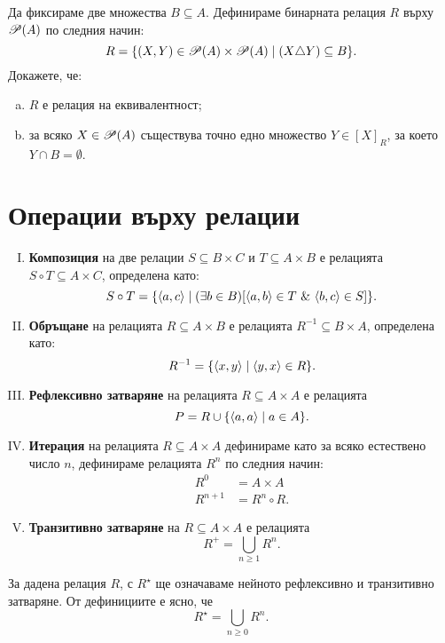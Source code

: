 \begin{problem}
  Да фиксираме две множества $B \subseteq A$. Дефинираме бинарната релация $R$ върху $\mathscr{P}(A)$ по следния начин:
  \[R = \{(X,Y) \in \mathscr{P}(A)\times\mathscr{P}(A) \mid (X \triangle Y) \subseteq B\}.\]
  Докажете, че:
  \begin{enumerate}[a)]
  \item 
    $R$ е релация на еквивалентност;
  \item
    за всяко $X \in \mathscr{P}(A)$ съществува точно едно множество $Y \in [X]_R$, за което $Y \cap B = \emptyset$.
  \end{enumerate}
\end{problem}


\section{Операции върху релации}
\begin{enumerate}[I)]
\item
  {\bf Композиция} на две релации $S \subseteq B\times C$ и $T \subseteq A\times B$ е релацията $S\circ T \subseteq A\times C$,
  определена като:
  \[S\circ T = \{\langle{a,c}\rangle \mid (\exists b \in B)[\pair{a,b}\in T\ \&\ \pair{b,c} \in S]\}.\]
\item
  {\bf Обръщане} на релацията $R \subseteq A\times B$ е релацията $R^{-1}\subseteq B\times A$, 
  определена като:
  \[R^{-1} = \{\langle{x,y}\rangle \mid \langle{y,x}\rangle \in R\}.\]
  \item
  {\bf Рефлексивно затваряне} на релацията $R \subseteq A\times A$ е релацията
  \[P = R \cup \{\langle{a,a}\rangle \mid a\in A\}.\]
\item
  {\bf Итерация} на релацията $R \subseteq A\times A$ дефинираме като за всяко естествено число $n$,
  дефинираме релацията $R^n$ по следния начин:
  \begin{align*}
    R^0 & = A\times A\\
    R^{n+1} & = R^n \circ R.
  \end{align*}
\item
  {\bf Транзитивно затваряне} на $R \subseteq A\times A$ е релацията
  \[R^+ = \bigcup_{n\geq 1} R^n.\]
\end{enumerate}

За дадена релация $R$, с $R^\star$ ще означаваме нейното рефлексивно и транзитивно затваряне.
От дефинициите е ясно, че \[R^\star = \bigcup_{n\geq 0} R^n.\]


